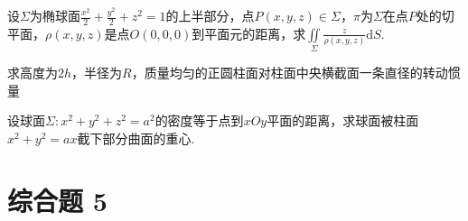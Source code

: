 \begin{xiti}
		
	\item 	设$\Sigma$为椭球面$\frac{x^{2}}{2}+\frac{y^{2}}{2}+z^{2}=1$的上半部分，点$P(x, y, z) \in \Sigma$，$\pi $为$\Sigma$在点$P$处的切平面，$\rho(x, y, z)$是点$O(0,0,0)$到平面元的距离，求$\iint\limits_{\Sigma} \frac{z}{\rho(x, y, z)} \mathrm{d} S$.
	
	\item 求高度为$2h$，半径为$R$，质量均匀的正圆柱面对柱面中央横截面一条直径的转动惯量
	\item  设球面$\Sigma : x^{2}+y^{2}+z^{2}=a^{2}$的密度等于点到$xOy$平面的距离，求球面被柱面$x^{2}+y^{2}=a x$截下部分曲面的重心.
	
\end{xiti}
\section{综合题 5}
